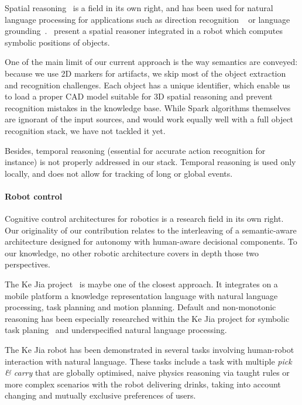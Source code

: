 \documentclass[preprint,3p,times]{elsarticle}
\begin{document}
Spatial reasoning~\cite{O'Keefe1999} is a field in its own right, and has been
used for natural language processing for applications such as direction
recognition ~\cite{Kollar2010,Matuszek2010} or language
grounding~\cite{Tellex2010}.~\cite{Skubic2004} present a spatial reasoner
integrated in a robot which computes symbolic positions of objects.

One of the main limit of our current approach is the way semantics are
conveyed: because we use 2D markers for artifacts, we skip most of the object
extraction and recognition challenges. Each object has a unique identifier,
which enable us to load a proper CAD model suitable for 3D spatial reasoning
and prevent recognition mistakes in the knowledge base. While {\sc Spark}
algorithms themselves are ignorant of the input sources, and would work equally
well with a full object recognition stack, we have not tackled it yet.

Besides, temporal reasoning (essential for accurate action recognition for
instance) is not properly addressed in our stack. Temporal reasoning is used
only locally, and does not allow for tracking of long or global events.

\paragraph{Robot control}

Cognitive control architectures for robotics is a research field in its own right.
Our originality of our contribution relates to the interleaving of a
semantic-aware architecture designed for autonomy with human-aware decisional
components. To our knowledge, no other robotic architecture covers in depth
those two perspectives.

The Ke Jia project~\cite{Chen2010} is maybe one of the closest approach. It
integrates on a mobile platform a knowledge representation language with
natural language processing, task planning and motion planning. Default and
non-monotonic reasoning has been especially researched within the Ke Jia
project for symbolic task planing~\cite{Ji2011} and underspecified natural
language processing.

The Ke Jia robot has been demonstrated in several tasks involving human-robot
interaction with natural language. These tasks include a task with multiple
\emph{pick \& carry} that are globally optimised, naive physics reasoning via
taught rules or more complex scenarios with the robot delivering drinks, taking
into account changing and mutually exclusive preferences of users.
\end{document}
